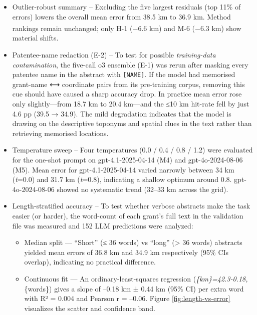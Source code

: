 \documentclass[
  10pt]{article}
\providecommand{\passthrough}[1]{#1}
\providecommand{\tightlist}{%
  \setlength{\itemsep}{0pt}\setlength{\parskip}{0pt}}
\begin{document}
\begin{itemize}
\item
  Outlier-robust summary -- Excluding the five largest residuals (top
  11\% of errors) lowers the overall mean error from 38.5 km to 36.9 km.
  Method rankings remain unchanged; only
  H-1\textsuperscript{} (−6.6 km) and
  M-6 (−6.3 km) show material shifts.
\item
  Patentee-name redaction (E-2) -- To test for possible
  \emph{training-data contamination}, the five-call o3 ensemble (E-1)
  was rerun after masking every patentee name in the abstract with
  \passthrough{\lstinline![NAME]!}. If the model had memorised
  grant-name ⟷ coordinate pairs from its pre-training corpus, removing
  this cue should have caused a sharp accuracy drop. In practice mean
  error rose only slightly---from 18.7 km to 20.4 km---and the ≤10 km
  hit-rate fell by just 4.6 pp (39.5 → 34.9). The mild degradation
  indicates that the model is drawing on the descriptive toponyms and
  spatial clues in the text rather than retrieving memorised locations.
\item
  Temperature sweep -- Four temperatures (0.0 / 0.4 / 0.8 / 1.2) were
  evaluated for the one-shot prompt on gpt-4.1-2025-04-14 (M4) and
  gpt-4o-2024-08-06 (M5). Mean error for gpt-4.1-2025-04-14 varied
  narrowly between 34 km (\emph{t}=0.0) and 31.7 km (\emph{t}=0.8),
  indicating a shallow optimum around 0.8. gpt-4o-2024-08-06 showed no
  systematic trend (32--33 km across the grid).
\item
  Length‐stratified accuracy -- To test whether verbose abstracts make
  the task easier (or harder), the word-count of each grant's full text
  in the validation file was measured and 152 LLM predictions were
  analyzed:

  \begin{itemize}
  \tightlist
  \item
    Median split --- ``Short'' (≤ 36 words) vs ``long'' (\textgreater{}
    36 words) abstracts yielded mean errors of 36.8 km and 34.9 km
    respectively (95\% CIs overlap), indicating no practical
    difference.\\
  \item
    Continuous fit --- An ordinary-least-squares regression
    (\emph{\{km\}=42.3-0.18,}\{words\}) gives a
    slope of --0.18 km ± 0.44 km (95\% CI) per extra word with R² =
    0.004 and Pearson r = --0.06. Figure \ref{fig:length-vs-error}
    visualizes the scatter and confidence band.
  \end{itemize}
\end{itemize}
\end{document}
